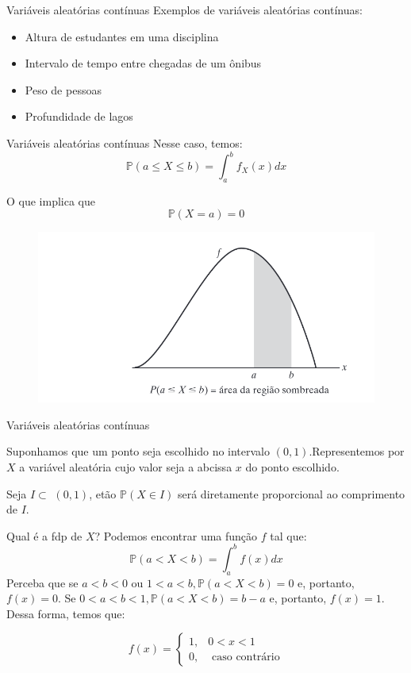 \begin{frame}{Variáveis aleatórias contínuas}
    Exemplos de variáveis aleatórias contínuas:
    \begin{itemize}
        \item Altura de estudantes em uma disciplina
        \item Intervalo de tempo entre chegadas de um ônibus
        \item Peso de pessoas
        \item Profundidade de lagos
    \end{itemize}
\end{frame}
\begin{frame}{Variáveis aleatórias contínuas}
Nesse caso, temos:
   $$ \mathds{P}(a \leq X \leq b) = \int_{a}^{b} f_X(x) dx$$

   O que implica que
   $$\mathds{P}(X =a) = 0$$

   \begin{figure}
       \centering
       \includegraphics[width=0.7\linewidth]{figures/continua_1.png}
   \end{figure}
\end{frame}

\begin{frame}{Variáveis aleatórias contínuas}
    \begin{exemplo}[20]
        Suponhamos que um ponto seja escolhido no intervalo $(0,1)$.Representemos por $X$ a variável aleatória cujo valor seja a abcissa $x$ do ponto escolhido. 

        Seja $I \subset$ $(0,1)$, etão $\mathds{P}(X \in I)$ será diretamente proporcional ao comprimento de $I$.

        Qual é a fdp de $X$? Podemos encontrar uma função $f$ tal que:
        \pause
        $$\mathds{P}(a<X<b) = \int_{a}^{b} f(x) dx$$
        \pause
        Perceba que se $a<b<0$ ou $1<a<b, \mathds{P}(a<X<b) =0$ e, portanto, $f(x) =0$. Se $0<a<b<1, \mathds{P}(a<X<b) = b-a$ e, portanto, $f(x) = 1$. Dessa forma, temos que:

        $$f(x) = \begin{cases}
            1, &0<x<1\\
            0, &\text{ caso contrário}
        \end{cases}$$
    \end{exemplo}
\end{frame}

